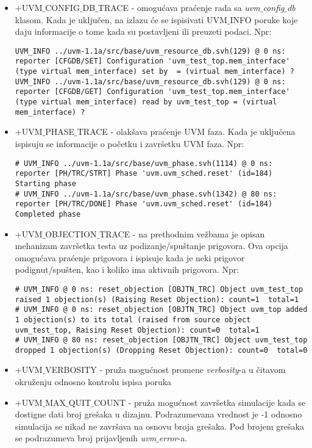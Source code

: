 \begin{itemize}

\item +UVM\(\_\)CONFIG\(\_\)DB\(\_\)TRACE - omogućava praćenje rada sa
  \emph{uvm\(\_\)config\(\_\)db} klasom. Kada je uključen, na izlazu će se
  ispisivati UVM\(\_\)INFO poruke koje daju informacije o tome kada su
  postavljeni ili preuzeti podaci. Npr:
  \begin{lstlisting}
UVM_INFO ../uvm-1.1a/src/base/uvm_resource_db.svh(129) @ 0 ns: reporter [CFGDB/SET] Configuration 'uvm_test_top.mem_interface' (type virtual mem_interface) set by  = (virtual mem_interface) ?
UVM_INFO ../uvm-1.1a/src/base/uvm_resource_db.svh(129) @ 0 ns: reporter [CFGDB/GET] Configuration 'uvm_test_top.mem_interface' (type virtual mem_interface) read by uvm_test_top = (virtual mem_interface) ?
  \end{lstlisting}

\item +UVM\(\_\)PHASE\(\_\)TRACE - olakšava praćenje UVM faza. Kada je uključena
  ispisuju se informacije o početku i završetku UVM faza. Npr:
  \begin{lstlisting}
# UVM_INFO ../uvm-1.1a/src/base/uvm_phase.svh(1114) @ 0 ns: reporter [PH/TRC/STRT] Phase 'uvm.uvm_sched.reset' (id=184) Starting phase
# UVM_INFO ../uvm-1.1a/src/base/uvm_phase.svh(1342) @ 80 ns: reporter [PH/TRC/DONE] Phase 'uvm.uvm_sched.reset' (id=184) Completed phase
  \end{lstlisting}

\item +UVM\(\_\)OBJECTION\(\_\)TRACE - na prethodnim vežbama je opisan mehanizam
  završetka testa uz podizanje/spuštanje prigovora. Ova opcija omogućava
  praćenje prigovora i ispisuje kada je neki prigovor podignut/spušten, kao i
  koliko ima aktivnih prigovora. Npr:
  \begin{lstlisting}
# UVM_INFO @ 0 ns: reset_objection [OBJTN_TRC] Object uvm_test_top raised 1 objection(s) (Raising Reset Objection): count=1  total=1
# UVM_INFO @ 0 ns: reset_objection [OBJTN_TRC] Object uvm_top added 1 objection(s) to its total (raised from source object uvm_test_top, Raising Reset Objection): count=0  total=1
# UVM_INFO @ 80 ns: reset_objection [OBJTN_TRC] Object uvm_test_top dropped 1 objection(s) (Dropping Reset Objection): count=0  total=0
  \end{lstlisting}

\item +UVM\(\_\)VERBOSITY - pruža mogućnost promene \emph{verbosity}-a u čitavom
  okruženju odnosno kontrolu ispisa poruka
  
\item +UVM\(\_\)MAX\(\_\)QUIT\(\_\)COUNT - pruža mogućnost završetka simulacije
  kada se dostigne dati broj grešaka u dizajnu. Podrazumevana vrednost je -1
  odnosno simulacija se nikad ne završava na osnovu broja grešaka. Pod brojem
  grešaka se podrazumeva broj prijavljenih \emph{uvm\(\_\)error}-a.
\end{itemize}

